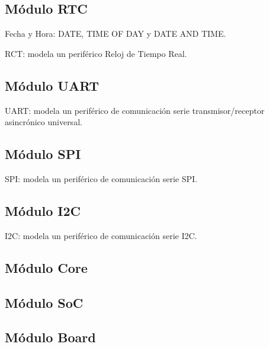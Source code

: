 \subsection{Módulo RTC}

Fecha y Hora: DATE, TIME OF DAY y DATE AND TIME.


RCT: modela un periférico Reloj de Tiempo Real.

\subsection{Módulo UART}


UART: modela un periférico de comunicación serie transmisor/receptor asincrónico universal.
\subsection{Módulo SPI}


SPI: modela un periférico de comunicación serie SPI.

\subsection{Módulo I2C}

I2C: modela un periférico de comunicación serie I2C.

\subsection{Módulo Core}


\subsection{Módulo SoC}

\subsection{Módulo Board}


